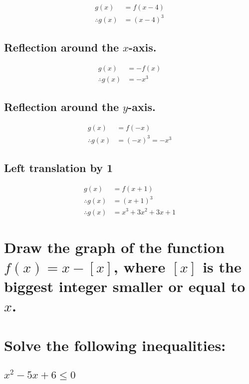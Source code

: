 \documentclass[fleqn, a4paper, 10pt]{article}
\begin{document}
\begin{align*}
	g(x) &= f(x-4)\\
	\therefore g(x) &= (x-4)^3
\end{align*}

\subsection{Reflection around the $x$-axis.}

\begin{align*}
	g(x) &= -f(x)\\
	\therefore g(x) &= -x^3
\end{align*}

\subsection{Reflection around the $y$-axis.}

\begin{align*}
	g(x) &= f(-x)\\
	\therefore g(x) &= (-x)^3 = -x^3
\end{align*}

\subsection{Left translation by 1}

\begin{align*}
g(x) &= f(x+1)\\
\therefore g(x) &= (x+1)^3\\
\therefore g(x) &= x^3 + 3x^2 + 3x +1
\end{align*}

\section{Draw the graph of the function $f(x) = x - [x]$, where $[x]$ is the biggest integer smaller or equal to $x$.}

\vspace{3in}

\section{Solve the following inequalities:}

\subsection{$x^2 - 5x + 6 \leq 0$}
\end{document}
